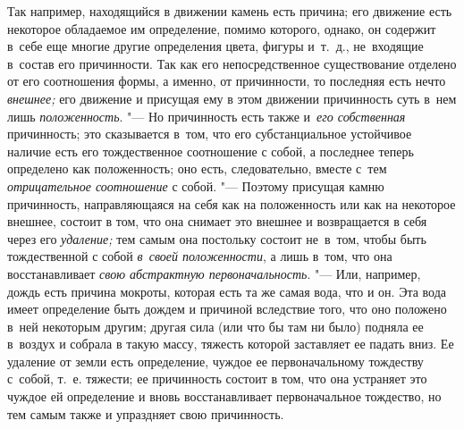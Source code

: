 Так например, находящийся в движении камень есть причина; его движение есть
некоторое обладаемое им определение, помимо которого, однако, он содержит
в~себе еще многие другие определения цвета, фигуры и~т.~д., не~входящие
в~состав его причинности. Так как его непосредственное существование отделено
от его соотношения формы, а именно, от причинности, то последняя есть нечто
{\em внешнее;} его движение и присущая ему в этом движении причинность суть
в~нем лишь {\em положенность}. "--- Но причинность есть также и~{\em его
собственная} причинность; это сказывается в~том, что его субстанциальное
устойчивое наличие есть его тождественное соотношение с собой, а последнее
теперь определено как положенность; оно есть, следовательно, вместе с~тем
{\em отрицательное соотношение} с собой. "--- Поэтому присущая камню
причинность, направляющаяся на себя как на положенность или как на некоторое
внешнее, состоит в том, что она снимает это внешнее и возвращается в себя через
его {\em удаление;} тем самым она постольку состоит не~в~том, чтобы быть
тождественной с собой {\em в~своей положенности}, а лишь в~том, что она
восстанавливает {\em свою абстрактную первоначальность}. "--- Или, например,
дождь есть причина мокроты, которая есть та же самая вода, что и он. Эта вода
имеет определение быть дождем и причиной вследствие того, что оно положено
в~ней некоторым другим; другая сила (или что бы там ни было) подняла ее
в~воздух и собрала в такую массу, тяжесть которой заставляет ее падать вниз. Ее
удаление от земли есть определение, чуждое ее первоначальному тождеству
с~собой, т.~е. тяжести; ее причинность состоит в том, что она устраняет это
чуждое ей определение и вновь восстанавливает первоначальное тождество, но тем
самым также и упраздняет свою причинность.

